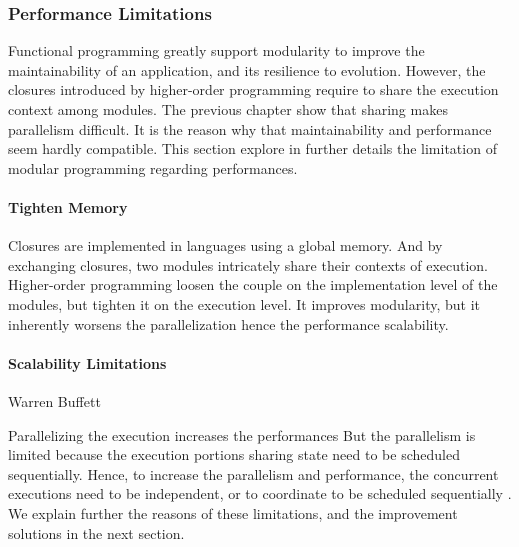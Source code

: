 
\subsubsection{Performance Limitations} \label{chapter3:software-maintainability:modular-programming:limitations}

Functional programming greatly support modularity to improve the maintainability of an application, and its resilience to evolution.
However, the closures introduced by higher-order programming require to share the execution context among modules.
The previous chapter show that sharing makes parallelism difficult.
It is the reason why that maintainability and performance seem hardly compatible.
This section explore in further details the limitation of modular programming regarding performances.

\paragraph{Tighten Memory}

Closures are implemented in languages using a global memory.
And by exchanging closures, two modules intricately share their contexts of execution.
Higher-order programming loosen the couple on the implementation level of the modules, but tighten it on the execution level.
It improves modularity, but it inherently worsens the parallelization hence the performance scalability.

\paragraph{Scalability Limitations}

{Warren Buffett}

Parallelizing the execution increases the performances \cite{Amdahl1967,Gunther1993}
But the parallelism is limited because the execution portions sharing state need to be scheduled sequentially.
Hence, to increase the parallelism and performance, the concurrent executions need to be independent, or to coordinate to be scheduled sequentially \cite{Gustafson1988,Gunther1996,Nelson1996,Gunther2002}.
We explain further the reasons of these limitations, and the improvement solutions in the next section.

